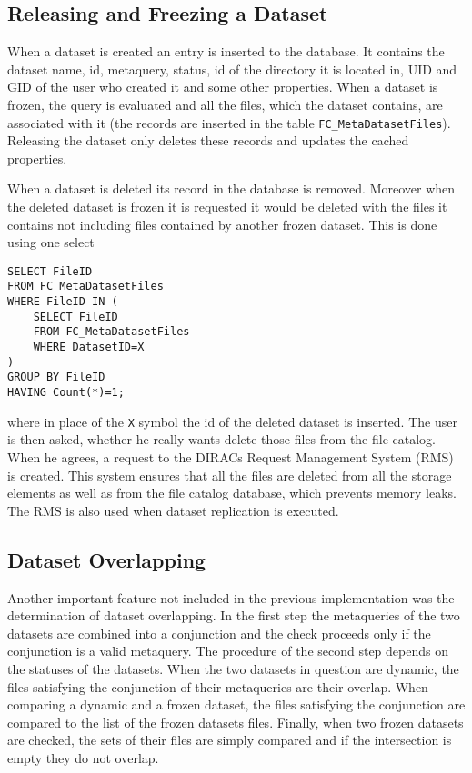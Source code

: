 \subsection{Releasing and Freezing a Dataset}

When a dataset is created an entry is inserted to the database. It contains the dataset name, id, metaquery, 
status, id of the directory it is located in, UID and GID of the user who created it and some other 
properties. When a dataset is frozen, the query is evaluated and all the files, which the
dataset contains, are associated with it (the records are inserted in the table \texttt{FC\_MetaDatasetFiles}).
Releasing the dataset only deletes these records and updates the cached properties. 

When a dataset is deleted its record in the database is removed. Moreover when the deleted dataset is frozen
it is requested it would be deleted with the files it contains not including files contained by another frozen
dataset. This is done using one select

\begin{verbatim}
SELECT FileID 
FROM FC_MetaDatasetFiles 
WHERE FileID IN (
	SELECT FileID 
	FROM FC_MetaDatasetFiles 
	WHERE DatasetID=X
) 
GROUP BY FileID 
HAVING Count(*)=1;
\end{verbatim}

\noindent where in place of the \texttt{X} symbol the id of the deleted dataset is inserted. The user is then 
asked, whether he really wants  delete those files from the file catalog. When he agrees, a request to
the DIRACs Request Management System (RMS) is created. This system ensures that all the files
are deleted from all the storage elements as well as from the file catalog database, 
which prevents memory leaks. The RMS is also used when dataset replication is executed.

\subsection{Dataset Overlapping}

Another important feature not included in the previous implementation was the determination of  
dataset overlapping. In the first step the metaqueries of the two datasets are combined
into a conjunction and the check proceeds only if the conjunction is a valid metaquery.
The procedure of the second step depends on the statuses of the datasets. When the two
datasets in question are dynamic, the files satisfying the conjunction of their metaqueries
are their overlap. When comparing a dynamic and a frozen dataset, the files satisfying 
the conjunction are compared to the list of the frozen datasets files. Finally, when 
two frozen datasets are checked, the sets of their files are simply compared and if 
the intersection is empty they do not overlap.